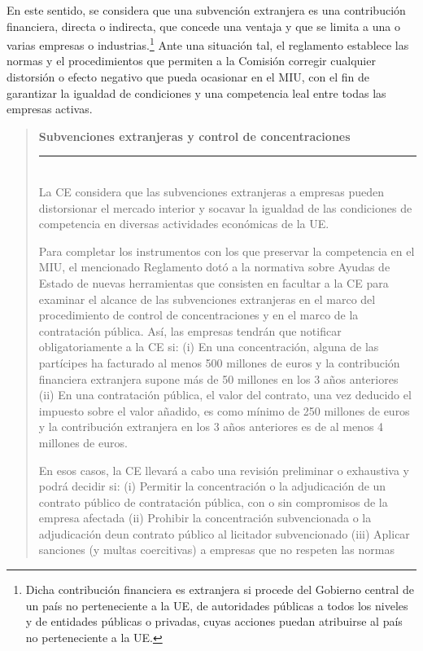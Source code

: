 \documentclass[10pt,a4paper]{article}
\newenvironment{specialblock}[1]{%
      \begin{quote} %
      \small %
      \noindent\textbf{#1}\\[-0.3em] %
      \rule{\linewidth}{0.4pt}\\[0.6em]}{
      \end{quote}}
\begin{document}
En este sentido, se considera que una subvención extranjera es una contribución financiera, directa o indirecta, que concede una ventaja y que se limita a una o varias empresas o industrias.\footnote{%
    Dicha contribución financiera es extranjera si procede del Gobierno central de un país no perteneciente a la UE, de autoridades públicas a todos los niveles y de entidades públicas o privadas, cuyas acciones puedan atribuirse al país no perteneciente a la UE.
} Ante una situación tal, el reglamento establece las normas y el procedimientos que permiten a la Comisión corregir cualquier distorsión o efecto negativo que pueda ocasionar en el MIU, con el fin de garantizar la igualdad de condiciones y una competencia leal entre todas las empresas activas.

\begin{specialblock}{Subvenciones extranjeras y control de concentraciones}
    La CE considera que las subvenciones extranjeras a empresas pueden distorsionar el mercado interior y socavar la igualdad de las condiciones de competencia en diversas actividades económicas de la UE.
    
    Para completar los instrumentos con los que preservar la competencia en el MIU, el mencionado Reglamento dotó a la normativa sobre Ayudas de Estado de nuevas herramientas que consisten en facultar a la CE para examinar el alcance de las subvenciones extranjeras en el marco del procedimiento de control de concentraciones y en el marco de la contratación pública. Así, las empresas tendrán que notificar obligatoriamente a la CE si: (i) En una concentración, alguna de las partícipes ha facturado al menos 500 millones de euros y la contribución financiera extranjera supone más de 50 millones en los 3 años anteriores (ii) En una contratación pública, el valor del contrato, una vez deducido el impuesto sobre el valor añadido, es como mínimo de 250 millones de euros y la contribución extranjera en los 3 años anteriores es de al menos 4 millones de euros. 
    
    En esos casos, la CE llevará a cabo una revisión preliminar o exhaustiva y podrá decidir si: (i) Permitir la concentración o la adjudicación de un contrato público de contratación pública, con o sin compromisos de la empresa afectada (ii) Prohibir la concentración subvencionada o la adjudicación deun contrato público al licitador  subvencionado (iii) Aplicar sanciones (y multas coercitivas) a empresas que no respeten las normas
\end{specialblock}
\end{document}
